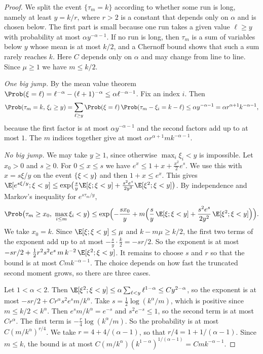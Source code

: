 \begin{proof}
We split the event $\{\tau_m=k\}$ according to whether some run is long, namely at least
$y=k/r$, where $r>2$ is a constant that depends only on $\alpha$ and is chosen below. The
first part is small because one run takes a given value $\ell\ge y$ with probability at
most $\alpha y^{-\alpha-1}$. If no run is long, then $\tau_m$ is a sum of variables below $y$ whose mean is at most $k/2$,
and a Chernoff bound shows that such a sum rarely reaches $k$. Here $C$ depends only on
$\alpha$ and may change from line to line. Since $\mu\ge1$ we have $m\le k/2$.

\emph{One big jump.} By the mean value theorem
$\Prob(\xi=\ell)=\ell^{-\alpha}-(\ell+1)^{-\alpha}\le\alpha\ell^{-\alpha-1}$. Fix an
index $i$. Then
\[
\Prob(\tau_m=k,\,\xi_i\ge y)=\sum_{\ell\ge y}\Prob(\xi=\ell)\,\Prob(\tau_m-\xi_i=k-\ell)
\le\alpha y^{-\alpha-1}=\alpha r^{\alpha+1}k^{-\alpha-1},
\]
because the first factor is at most $\alpha y^{-\alpha-1}$ and the second factors add up
to at most $1$. The $m$ indices together give at most $\alpha r^{\alpha+1}mk^{-\alpha-1}$.

\emph{No big jump.} We may take $y\ge1$, since otherwise $\max_i\xi_i<y$ is impossible.
Let $x_0>0$ and $s\ge0$. For $0\le x\le s$ we have
$e^x\le1+x+\frac{x^2}2e^s$. We use this with $x=s\xi/y$ on the event $\{\xi<y\}$ and then
$1+x\le e^x$. This gives
$\E[e^{s\xi/y};\xi<y]\le\exp\bigl(\frac sy\E[\xi;\xi<y]+\frac{s^2e^s}{2y^2}\E[\xi^2;\xi<y]\bigr)$.
By independence and Markov's inequality for $e^{s\tau_m/y}$,
\begin{equation}\label{eq:C-chernoff}
\Prob\bigl(\tau_m\ge x_0,\ \max_{i\le m}\xi_i<y\bigr)
\le\exp\Bigl(-\frac{sx_0}y+m\Bigl(\frac sy\,\E[\xi;\xi<y]
+\frac{s^2e^s}{2y^2}\,\E[\xi^2;\xi<y]\Bigr)\Bigr).
\end{equation}
We take $x_0=k$. Since $\E[\xi;\xi<y]\le\mu$ and $k-m\mu\ge k/2$, the first two terms of
the exponent add up to at most $-\frac sy\cdot\frac k2=-sr/2$. So the exponent is at most
$-sr/2+\frac12r^2s^2e^s\,m\,k^{-2}\,\E[\xi^2;\xi<y]$. It remains to choose $s$ and $r$ so that the bound is at most $Cmk^{-\alpha-1}$. The
choice depends on how fast the truncated second moment grows, so there are three cases.

Let $1<\alpha<2$. Then $\E[\xi^2;\xi<y]\le\alpha\sum_{\ell<y}\ell^{1-\alpha}\le
Cy^{2-\alpha}$, so the exponent is at most $-sr/2+Cr^\alpha s^2e^sm/k^\alpha$. Take
$s=\frac12\log(k^\alpha/m)$, which is positive since $m\le k/2<k^\alpha$. Then
$e^sm/k^\alpha=e^{-s}$ and $s^2e^{-s}\le1$, so the second term is at most $Cr^\alpha$.
The first term is $-\frac r4\log(k^\alpha/m)$. So the probability is at most
$C(m/k^\alpha)^{r/4}$. We take $r=4+4/(\alpha-1)$, so that $r/4=1+1/(\alpha-1)$. Since
$m\le k$, the bound is at most
$C(m/k^\alpha)(k^{1-\alpha})^{1/(\alpha-1)}=Cmk^{-\alpha-1}$.


\end{proof}
